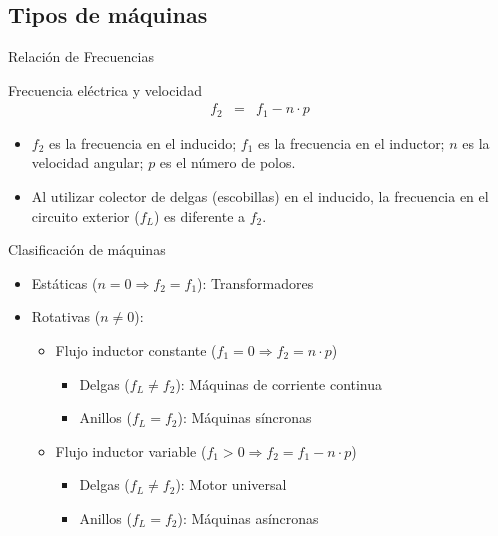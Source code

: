 \documentclass[xcolor={usenames,svgnames,dvipsnames}]{beamer}
\begin{document}
\subsection{Tipos de máquinas}
\label{sec:org6a6b70d}
\begin{frame}[label={sec:org7d7c35a}]{Relación de Frecuencias}
\begin{block}{Frecuencia eléctrica y velocidad}
$$\begin{aligned}
  f_{2} & = & f_{1}-n\cdot p\end{aligned}$$

\begin{itemize}
\item \(f_{2}\) es la frecuencia en el inducido; \(f_{1}\) es la frecuencia en
el inductor; \(n\) es la velocidad angular; \(p\) es el número de polos.

\item Al utilizar colector de delgas (escobillas) en el inducido, la
frecuencia en el circuito exterior (\(f_{L}\)) es diferente a \(f_{2}\).
\end{itemize}
\end{block}
\end{frame}

\begin{frame}[label={sec:orgf95b4af}]{Clasificación de máquinas}
\begin{itemize}
\item Estáticas (\(n=0\Rightarrow f_{2}=f_{1}\)): Transformadores

\item Rotativas (\(n\neq0\)):

\begin{itemize}
\item Flujo inductor constante (\(f_{1}=0\Rightarrow f_{2}=n\cdot
            p\))

\begin{itemize}
\item Delgas (\(f_{L}\neq f_{2}\)): Máquinas de corriente continua

\item Anillos (\(f_{L}=f_{2}\)): Máquinas síncronas
\end{itemize}

\item Flujo inductor variable (\(f_{1}>0\Rightarrow
            f_{2}=f_{1}-n\cdot p\))

\begin{itemize}
\item Delgas (\(f_{L}\neq f_{2}\)): Motor universal

\item Anillos (\(f_{L}=f_{2}\)): Máquinas asíncronas
\end{itemize}
\end{itemize}
\end{itemize}
\end{frame}
\end{document}
